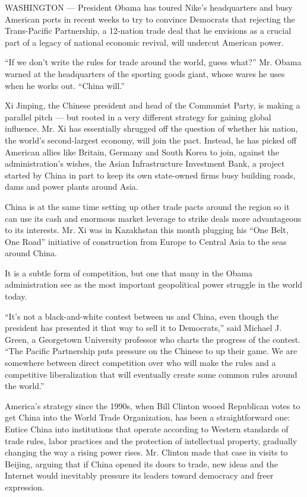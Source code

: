 WASHINGTON --- President Obama has toured Nike's headquarters and busy
American ports in recent weeks to try to convince Democrats that
rejecting the Trans-Pacific Partnership, a 12-nation trade deal that he
envisions as a crucial part of a legacy of national economic revival,
will undercut American power.

``If we don't write the rules for trade around the world, guess what?''
Mr. Obama warned at the headquarters of the sporting goods giant, whose
wares he uses when he works out. ``China will.''

Xi Jinping, the Chinese president and head of the Communist Party, is
making a parallel pitch --- but rooted in a very different strategy for
gaining global influence. Mr. Xi has essentially shrugged off the
question of whether his nation, the world's second-largest economy, will
join the pact. Instead, he has picked off American allies like Britain,
Germany and South Korea to join, against the administration's wishes,
the Asian Infrastructure Investment Bank, a project started by China in
part to keep its own state-owned firms busy building roads, dams and
power plants around Asia.

China is at the same time setting up other trade pacts around the region
so it can use its cash and enormous market leverage to strike deals more
advantageous to its interests. Mr. Xi was in Kazakhstan this month
plugging his ``One Belt, One Road'' initiative of construction from
Europe to Central Asia to the seas around China.

It is a subtle form of competition, but one that many in the Obama
administration see as the most important geopolitical power struggle in
the world today.

``It's not a black-and-white contest between us and China, even though
the president has presented it that way to sell it to Democrats,'' said
Michael J. Green, a Georgetown University professor who charts the
progress of the contest. ``The Pacific Partnership puts pressure on the
Chinese to up their game. We are somewhere between direct competition
over who will make the rules and a competitive liberalization that will
eventually create some common rules around the world.''

America's strategy since the 1990s, when Bill Clinton wooed Republican
votes to get China into the World Trade Organization, has been a
straightforward one: Entice China into institutions that operate
according to Western standards of trade rules, labor practices and the
protection of intellectual property, gradually changing the way a rising
power rises. Mr. Clinton made that case in visits to Beijing, arguing
that if China opened its doors to trade, new ideas and the Internet
would inevitably pressure its leaders toward democracy and freer
expression.

